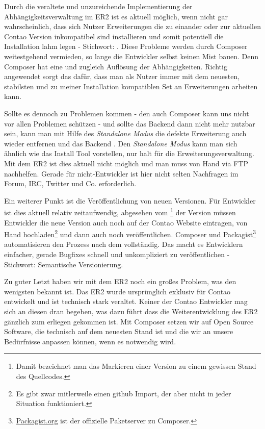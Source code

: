 \documentclass[
paper=a4,
draft=false,%
fontsize=10pt%
]{scrartcl}
\begin{document}
Durch die veraltete und unzureichende Implementierung der Abhängigkeitsverwaltung im ER2 ist es aktuell möglich, wenn nicht gar wahrscheinlich, dass sich Nutzer Erweiterungen die zu einander oder zur aktuellen Contao Version inkompatibel sind installieren und somit potentiell die Installation lahm legen - Stichwort: . Diese Probleme werden durch Composer weitestgehend vermieden, so lange die Entwickler selbst keinen Mist bauen. Denn Composer hat eine  und zugleich  Auflösung der Abhängigkeiten. Richtig angewendet sorgt das dafür, dass man als Nutzer immer mit dem neuesten, stabilsten und zu meiner Installation kompatiblen Set an Erweiterungen arbeiten kann.

Sollte es dennoch zu Problemen kommen - den auch Composer kann uns nicht vor allen Problemen schützen - und sollte das Backend dann nicht mehr nutzbar sein, kann man mit Hilfe des \textit{Standalone Modus} die defekte Erweiterung auch wieder entfernen und das Backend . Den \textit{Standalone Modus} kann man sich ähnlich wie das Install Tool vorstellen, nur halt für die Erweiterungsverwaltung. Mit dem ER2 ist dies aktuell nicht möglich und man muss von Hand via FTP nachhelfen. Gerade für nicht-Entwickler ist hier nicht selten Nachfragen im Forum, IRC, Twitter und Co. erforderlich.

Ein weiterer Punkt ist die Veröffentlichung von neuen Versionen. Für Entwickler ist dies aktuell relativ zeitaufwendig, abgesehen vom \footnote{Damit bezeichnet man das Markieren einer Version zu einem gewissen Stand des Quellcodes.} der Version müssen Entwickler die neue Version auch noch auf der Contao Website eintragen, von Hand hochladen\footnote{Es gibt zwar mitlerweile einen github Import, der aber nicht in jeder Situation funktioniert.} und dann auch noch veröffentlichen. Composer und Packagist\footnote{\href{https://packagist.org}{Packagist.org} ist der offizielle Paketserver zu Composer.} automatisieren den Prozess nach dem  vollständig. Das macht es Entwicklern einfacher, gerade Bugfixes schnell und unkompliziert zu veröffentlichen - Stichwort: Semantische Versionierung.

Zu guter Letzt haben wir mit dem ER2 noch ein großes Problem, was den wenigsten bekannt ist. Das ER2 wurde ursprünglich exklusiv für Contao entwickelt und ist technisch stark veraltet. Keiner der Contao Entwickler mag sich an diesen  dran begeben, was dazu führt dass die Weiterentwicklung des ER2 gänzlich zum erliegen gekommen ist. Mit Composer setzen wir auf Open Source Software, die technisch auf dem neuesten Stand ist und die wir an unsere Bedürfnisse anpassen können, wenn es notwendig wird.
\end{document}

